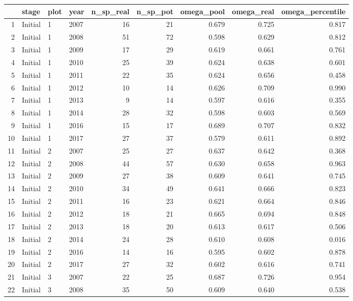 \begin{table}[ht]
\centering
\begin{tabular}{rlllrrrrr}
  \hline
 & stage & plot & year & n\_sp\_real & n\_sp\_pot & omega\_pool & omega\_real & omega\_percentile \\ 
  \hline
1 & Initial & 1 & 2007 & 16 & 21 & 0.679 & 0.725 & 0.817 \\ 
  2 & Initial & 1 & 2008 & 51 & 72 & 0.598 & 0.629 & 0.812 \\ 
  3 & Initial & 1 & 2009 & 17 & 29 & 0.619 & 0.661 & 0.761 \\ 
  4 & Initial & 1 & 2010 & 25 & 39 & 0.624 & 0.638 & 0.601 \\ 
  5 & Initial & 1 & 2011 & 22 & 35 & 0.624 & 0.656 & 0.458 \\ 
  6 & Initial & 1 & 2012 & 10 & 14 & 0.626 & 0.709 & 0.990 \\ 
  7 & Initial & 1 & 2013 & 9 & 14 & 0.597 & 0.616 & 0.355 \\ 
  8 & Initial & 1 & 2014 & 28 & 32 & 0.598 & 0.603 & 0.569 \\ 
  9 & Initial & 1 & 2016 & 15 & 17 & 0.689 & 0.707 & 0.832 \\ 
  10 & Initial & 1 & 2017 & 27 & 37 & 0.579 & 0.611 & 0.892 \\ 
  11 & Initial & 2 & 2007 & 25 & 27 & 0.637 & 0.642 & 0.368 \\ 
  12 & Initial & 2 & 2008 & 44 & 57 & 0.630 & 0.658 & 0.963 \\ 
  13 & Initial & 2 & 2009 & 27 & 38 & 0.609 & 0.641 & 0.745 \\ 
  14 & Initial & 2 & 2010 & 34 & 49 & 0.641 & 0.666 & 0.823 \\ 
  15 & Initial & 2 & 2011 & 16 & 23 & 0.621 & 0.664 & 0.846 \\ 
  16 & Initial & 2 & 2012 & 18 & 21 & 0.665 & 0.694 & 0.848 \\ 
  17 & Initial & 2 & 2013 & 18 & 20 & 0.613 & 0.617 & 0.506 \\ 
  18 & Initial & 2 & 2014 & 24 & 28 & 0.610 & 0.608 & 0.016 \\ 
  19 & Initial & 2 & 2016 & 14 & 16 & 0.595 & 0.602 & 0.878 \\ 
  20 & Initial & 2 & 2017 & 27 & 32 & 0.602 & 0.616 & 0.741 \\ 
  21 & Initial & 3 & 2007 & 22 & 25 & 0.687 & 0.726 & 0.954 \\ 
  22 & Initial & 3 & 2008 & 35 & 50 & 0.609 & 0.640 & 0.538 \\ 

\end{tabular}
\end{table}

